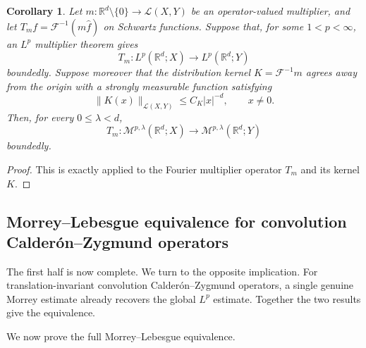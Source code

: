\documentclass[11pt]{article}
\newtheorem{corollary}[theorem]{Corollary}
\theoremstyle{definition}
\newcommand{\R}{\mathbb R}
\begin{document}
	\begin{corollary}\label{cor:fourier-multiplier-morrey-lifting}
		Let $m:\R^d\setminus\{0\}\to\mathcal L(X,Y)$ be an operator-valued multiplier, and let $T_mf=\mathcal F^{-1}(m\widehat f)$ on Schwartz functions.  Suppose that, for some $1<p<\infty$, an $L^p$ multiplier theorem gives
		\[
		T_m:L^p(\R^d;X)\to L^p(\R^d;Y)
		\]
		boundedly.  Suppose moreover that the distribution kernel $K=\mathcal F^{-1}m$ agrees away from the origin with a strongly measurable function satisfying
		\[
		\|K(x)\|_{\mathcal L(X,Y)}\le C_K |x|^{-d},
		\qquad x\ne0.
		\]
		Then, for every $0\le\lambda<d$,
		\[
		T_m:\mathcal M^{p,\lambda}(\R^d;X)
		\to
		\mathcal M^{p,\lambda}(\R^d;Y)
		\]
		boundedly.
	\end{corollary}

	\begin{proof}
		This is exactly  applied to the Fourier multiplier operator $T_m$ and its kernel $K$.
	\end{proof}



	\subsection{Morrey--Lebesgue equivalence for convolution Calder\'on--Zygmund operators}\label{subsec:morrey-lp-equivalence}

	The first half is now complete. We turn to the opposite implication. For translation-invariant convolution Calder\'on--Zygmund operators, a single genuine Morrey estimate already recovers the global $L^p$ estimate. Together the two results give the equivalence.

	We now prove the full Morrey--Lebesgue equivalence.
\end{document}
